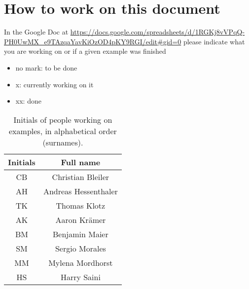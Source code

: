 %
\section{How to work on this document}
%
In the Google Doc at
\url{https://docs.google.com/spreadsheets/d/1RGKj8vVPqQ-PH0UwMX_e9TAzqaYavKiOzOD4pKY9RGI/edit#gid=0}
please indicate what you are working on or if a given example was finished
%
\begin{itemize}
    \item{no mark: to be done}
    \item{x: currently working on it}
    \item{xx: done}
\end{itemize}
%
\begin{table}[h!]
    \centering
    \begin{tabular}{ c | c }
        Initials & Full name \\
        \midrule
        CB       & Christian Bleiler \\
        AH       & Andreas Hessenthaler \\
        TK       & Thomas Klotz \\
        AK       & Aaron Kr\"amer \\
        BM       & Benjamin Maier \\
        SM       & Sergio Morales \\
        MM       & Mylena Mordhorst \\
        HS       & Harry Saini \\
    \end{tabular}
    \caption{Initials of people working on examples, in alphabetical order (surnames).}
    \label{initials-tab}
\end{table}
%
